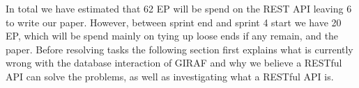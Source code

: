 In total we have estimated that 62 EP will be spend on the REST API leaving 6 to write our paper.
However, between sprint end and sprint 4 start we have 20 EP, which will be spend mainly on tying up loose ends if any remain, and the paper.
Before resolving tasks the following section first explains what is currently wrong with the database interaction of GIRAF and why we believe a RESTful API can solve the problems, as well as investigating what a RESTful API is.